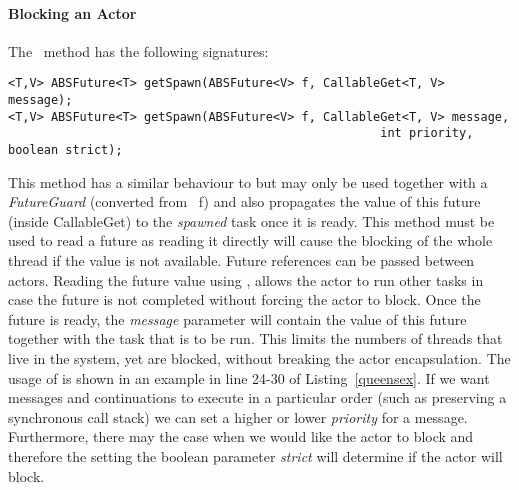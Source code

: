 \paragraph{Blocking an Actor}
The \gspawn ~method has the following signatures:

\begin{lstlisting}
<T,V> ABSFuture<T> getSpawn(ABSFuture<V> f, CallableGet<T, V> message);
<T,V> ABSFuture<T> getSpawn(ABSFuture<V> f, CallableGet<T, V> message, 
													int priority, boolean strict);
\end{lstlisting}

This method has a similar behaviour to \spawn but may only be used together with a \textit{FutureGuard} (converted from \future ~f) and also propagates the value of this future (inside CallableGet) to the \textit{spawned} task once it is ready. This method must be used to read a future as reading it directly will cause the blocking of the whole thread if the value is not available.  Future references can be passed between actors. Reading the future value using \gspawn, allows the actor to run other tasks in case the future is not completed without forcing the actor to block. Once the future is ready, the \textit{message} parameter will contain the value of this future together with the task that is to be run. This limits the numbers of threads that live in the system, yet are blocked, without breaking the actor encapsulation. The usage of \gspawn is shown in an example in line 24-30 of Listing~\ref{queensex}. If we want messages and continuations to execute in a particular order (such as preserving a synchronous call stack) we can set a higher or lower \textit{priority} for a message.  Furthermore, there may the case when we would like the actor to block and therefore the setting the boolean parameter \textit{strict} will determine if the actor will block.  

